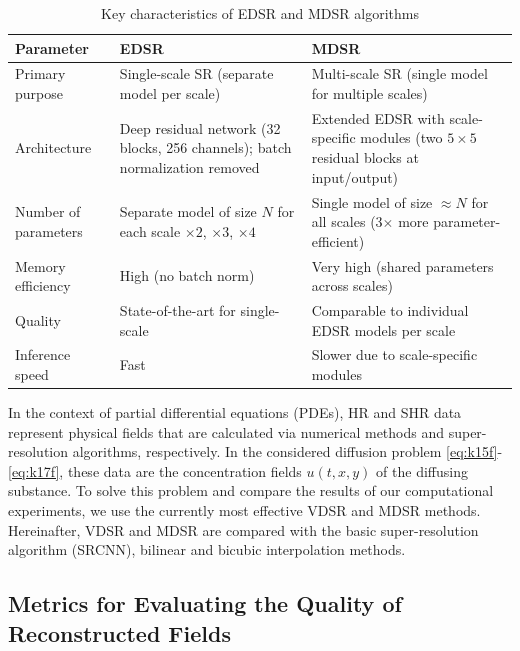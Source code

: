 \documentclass{ieeeaccess}
\begin{document}
\begin{table}[ht]
\caption{Key characteristics of EDSR and MDSR algorithms}
\setlength{\tabcolsep}{3pt}
\begin{tabular}{|p{40pt}|p{85pt}|p{95pt}|}
\hline
Parameter & EDSR & MDSR \\
\hline
Primary purpose & Single-scale SR  (separate model per scale) & Multi-scale SR (single model for multiple scales) \\
\hline
Architecture & Deep residual network (32 blocks, 256 channels); batch normalization removed & Extended EDSR with scale-specific modules (two $5\times5$ residual blocks at input/output) \\
\hline
Number of parameters & Separate model of size $N$ for each scale $\times2$, $\times3$, $\times4$ & Single model of size $\approx N$ for all scales (3$\times$ more parameter-efficient) \\
\hline
Memory efficiency & High (no batch norm) & Very high (shared parameters across scales) \\
\hline
Quality & State-of-the-art for single-scale & Comparable to individual EDSR models per scale \\
\hline
Inference speed & Fast & Slower due to scale-specific modules \\
\hline
\end{tabular}
\label{tab:k2t}
\end{table}

In the context of partial differential equations (PDEs), HR and SHR data represent physical fields that are calculated via numerical methods and super-resolution algorithms, respectively.
In the considered diffusion problem \eqref{eq:k15f}-\eqref{eq:k17f}, these data are the concentration fields $u(t,x,y)$ of the diffusing substance.
To solve this problem  and compare the results of our computational experiments, we use the currently most effective VDSR and MDSR methods.
Hereinafter, VDSR and MDSR are compared with the basic super-resolution algorithm (SRCNN), bilinear and bicubic interpolation methods.

\subsection{Metrics for Evaluating the Quality of Reconstructed Fields}
\end{document}
